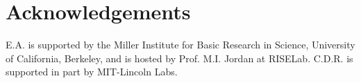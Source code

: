 \documentclass[sigconf]{acmart}
\begin{document}



\maketitle















\section*{Acknowledgements}
E.A. is supported by the Miller Institute for Basic Research in Science,
University of California, Berkeley, and is hosted by Prof. M.I. Jordan at RISELab.
%
C.D.R. is supported in part by MIT-Lincoln Labs.

%


\vspace{-1mm}


\end{document}
